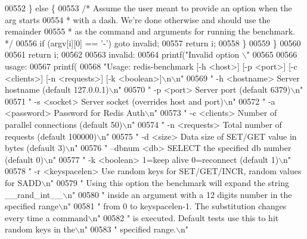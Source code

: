 \begin{DoxyCode}
{{{{{{{{{{{{{{{{{00552         \} \textcolor{keywordflow}{else} \{
00553             \textcolor{comment}{/* Assume the user meant to provide an option when the arg starts}
00554 \textcolor{comment}{             * with a dash. We're done otherwise and should use the remainder}
00555 \textcolor{comment}{             * as the command and arguments for running the benchmark. */}
00556             \textcolor{keywordflow}{if} (argv[i][0] == \textcolor{stringliteral}{'-'}) \textcolor{keywordflow}{goto} invalid;
00557             \textcolor{keywordflow}{return} i;
00558         \}
00559     \}
00560 
00561     \textcolor{keywordflow}{return} i;
00562 
00563 invalid:
00564     printf(\textcolor{stringliteral}{"Invalid option \(\backslash\)"%
00565 
00566 usage:
00567     printf(
00568 \textcolor{stringliteral}{"Usage: redis-benchmark [-h <host>] [-p <port>] [-c <clients>] [-n <requests>] [-k <boolean>]\(\backslash\)n\(\backslash\)n"}
00569 \textcolor{stringliteral}{" -h <hostname>      Server hostname (default 127.0.0.1)\(\backslash\)n"}
00570 \textcolor{stringliteral}{" -p <port>          Server port (default 6379)\(\backslash\)n"}
00571 \textcolor{stringliteral}{" -s <socket>        Server socket (overrides host and port)\(\backslash\)n"}
00572 \textcolor{stringliteral}{" -a <password>      Password for Redis Auth\(\backslash\)n"}
00573 \textcolor{stringliteral}{" -c <clients>       Number of parallel connections (default 50)\(\backslash\)n"}
00574 \textcolor{stringliteral}{" -n <requests>      Total number of requests (default 100000)\(\backslash\)n"}
00575 \textcolor{stringliteral}{" -d <size>          Data size of SET/GET value in bytes (default 3)\(\backslash\)n"}
00576 \textcolor{stringliteral}{" --dbnum <db>       SELECT the specified db number (default 0)\(\backslash\)n"}
00577 \textcolor{stringliteral}{" -k <boolean>       1=keep alive 0=reconnect (default 1)\(\backslash\)n"}
00578 \textcolor{stringliteral}{" -r <keyspacelen>   Use random keys for SET/GET/INCR, random values for SADD\(\backslash\)n"}
00579 \textcolor{stringliteral}{"  Using this option the benchmark will expand the string \_\_rand\_int\_\_\(\backslash\)n"}
00580 \textcolor{stringliteral}{"  inside an argument with a 12 digits number in the specified range\(\backslash\)n"}
00581 \textcolor{stringliteral}{"  from 0 to keyspacelen-1. The substitution changes every time a command\(\backslash\)n"}
00582 \textcolor{stringliteral}{"  is executed. Default tests use this to hit random keys in the\(\backslash\)n"}
00583 \textcolor{stringliteral}{"  specified range.\(\backslash\)n"}
}}}}}}}}}}}}}}}}}}
\end{DoxyCode}
